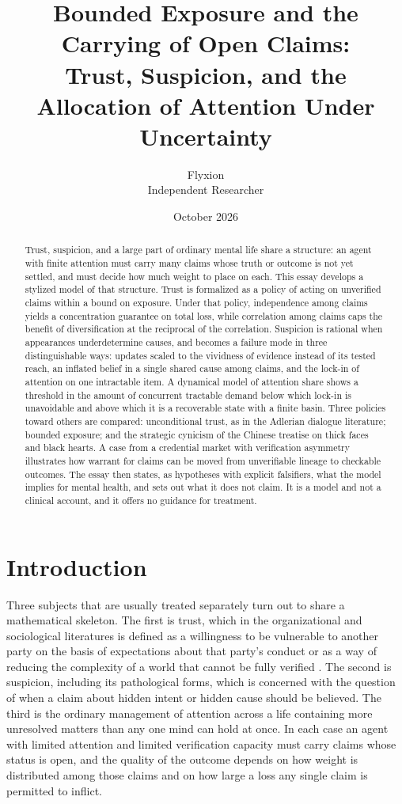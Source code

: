 \documentclass[11pt]{article}
\title{Bounded Exposure and the Carrying of Open Claims:\\Trust, Suspicion, and the Allocation of Attention Under Uncertainty}
\author{Flyxion\\\small Independent Researcher}
\date{October 2026}
\theoremstyle{definition}
\begin{document}
\maketitle

\begin{abstract}
\noindent Trust, suspicion, and a large part of ordinary mental life share a structure: an agent with finite attention must carry many claims whose truth or outcome is not yet settled, and must decide how much weight to place on each. This essay develops a stylized model of that structure. Trust is formalized as a policy of acting on unverified claims within a bound on exposure. Under that policy, independence among claims yields a concentration guarantee on total loss, while correlation among claims caps the benefit of diversification at the reciprocal of the correlation. Suspicion is rational when appearances underdetermine causes, and becomes a failure mode in three distinguishable ways: updates scaled to the vividness of evidence instead of its tested reach, an inflated belief in a single shared cause among claims, and the lock-in of attention on one intractable item. A dynamical model of attention share shows a threshold in the amount of concurrent tractable demand below which lock-in is unavoidable and above which it is a recoverable state with a finite basin. Three policies toward others are compared: unconditional trust, as in the Adlerian dialogue literature; bounded exposure; and the strategic cynicism of the Chinese treatise on thick faces and black hearts. A case from a credential market with verification asymmetry illustrates how warrant for claims can be moved from unverifiable lineage to checkable outcomes. The essay then states, as hypotheses with explicit falsifiers, what the model implies for mental health, and sets out what it does not claim. It is a model and not a clinical account, and it offers no guidance for treatment.
\end{abstract}

\section{Introduction}

Three subjects that are usually treated separately turn out to share a mathematical skeleton. The first is trust, which in the organizational and sociological literatures is defined as a willingness to be vulnerable to another party on the basis of expectations about that party's conduct \cite{mayer1995} or as a way of reducing the complexity of a world that cannot be fully verified \cite{luhmann1979}. The second is suspicion, including its pathological forms, which is concerned with the question of when a claim about hidden intent or hidden cause should be believed. The third is the ordinary management of attention across a life containing more unresolved matters than any one mind can hold at once. In each case an agent with limited attention and limited verification capacity must carry claims whose status is open, and the quality of the outcome depends on how weight is distributed among those claims and on how large a loss any single claim is permitted to inflict.
\end{document}
